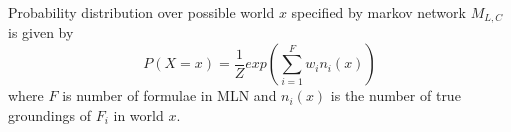 Probability distribution over possible world $x$ specified by markov network $M_{L,C}$ is given by
\begin{equation}
	\label{jointDistMLN}
	P(X = x) = \frac{1}{Z} exp \left( \displaystyle \sum_{i = 1}^{F} w_i n_i(x)  \right)
\end{equation}
where $F$ is number of formulae in MLN and $n_i(x)$ is the number of true groundings of
$F_i$ in world $x$.
